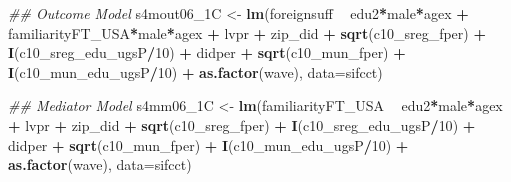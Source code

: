 \documentclass[
]{article}
\newenvironment{Shaded}{\begin{snugshade}}{\end{snugshade}}
\newcommand{\CommentTok}[1]{\textcolor[rgb]{0.56,0.35,0.01}{\textit{#1}}}
\newcommand{\DataTypeTok}[1]{\textcolor[rgb]{0.13,0.29,0.53}{#1}}
\newcommand{\DecValTok}[1]{\textcolor[rgb]{0.00,0.00,0.81}{#1}}
\newcommand{\KeywordTok}[1]{\textcolor[rgb]{0.13,0.29,0.53}{\textbf{#1}}}
\newcommand{\NormalTok}[1]{#1}
\newcommand{\OperatorTok}[1]{\textcolor[rgb]{0.81,0.36,0.00}{\textbf{#1}}}
\newcommand{\StringTok}[1]{\textcolor[rgb]{0.31,0.60,0.02}{#1}}
\begin{document}
\begin{Shaded}
\begin{Highlighting}[]
\CommentTok{## Outcome Model }
\NormalTok{s4mout06_1C <-}\StringTok{ }\KeywordTok{lm}\NormalTok{(foreignsuff  }\OperatorTok{~}\StringTok{ }\NormalTok{edu2}\OperatorTok{*}\NormalTok{male}\OperatorTok{*}\NormalTok{agex }\OperatorTok{+}\StringTok{ }\NormalTok{familiarityFT_USA}\OperatorTok{*}\NormalTok{male}\OperatorTok{*}\NormalTok{agex }\OperatorTok{+}\StringTok{ }\NormalTok{lvpr }\OperatorTok{+}\StringTok{  }
\StringTok{                    }\NormalTok{zip_did }\OperatorTok{+}\StringTok{ }\KeywordTok{sqrt}\NormalTok{(c10_sreg_fper) }\OperatorTok{+}\StringTok{ }\KeywordTok{I}\NormalTok{(c10_sreg_edu_ugsP}\OperatorTok{/}\DecValTok{10}\NormalTok{) }\OperatorTok{+}\StringTok{ }
\StringTok{                    }\NormalTok{didper }\OperatorTok{+}\StringTok{ }\KeywordTok{sqrt}\NormalTok{(c10_mun_fper) }\OperatorTok{+}\StringTok{ }\KeywordTok{I}\NormalTok{(c10_mun_edu_ugsP}\OperatorTok{/}\DecValTok{10}\NormalTok{) }\OperatorTok{+}\StringTok{ }
\StringTok{                    }\KeywordTok{as.factor}\NormalTok{(wave), }\DataTypeTok{data=}\NormalTok{sifcct)}

\CommentTok{## Mediator Model}
\NormalTok{s4mm06_1C <-}\StringTok{ }\KeywordTok{lm}\NormalTok{(familiarityFT_USA  }\OperatorTok{~}\StringTok{ }\NormalTok{edu2}\OperatorTok{*}\NormalTok{male}\OperatorTok{*}\NormalTok{agex }\OperatorTok{+}\StringTok{ }\NormalTok{lvpr }\OperatorTok{+}\StringTok{  }
\StringTok{                  }\NormalTok{zip_did }\OperatorTok{+}\StringTok{ }\KeywordTok{sqrt}\NormalTok{(c10_sreg_fper) }\OperatorTok{+}\StringTok{ }\KeywordTok{I}\NormalTok{(c10_sreg_edu_ugsP}\OperatorTok{/}\DecValTok{10}\NormalTok{) }\OperatorTok{+}\StringTok{ }
\StringTok{                  }\NormalTok{didper }\OperatorTok{+}\StringTok{ }\KeywordTok{sqrt}\NormalTok{(c10_mun_fper) }\OperatorTok{+}\StringTok{ }\KeywordTok{I}\NormalTok{(c10_mun_edu_ugsP}\OperatorTok{/}\DecValTok{10}\NormalTok{) }\OperatorTok{+}\StringTok{ }
\StringTok{                  }\KeywordTok{as.factor}\NormalTok{(wave), }\DataTypeTok{data=}\NormalTok{sifcct)}


\end{Highlighting}
\end{Shaded}
\end{document}
